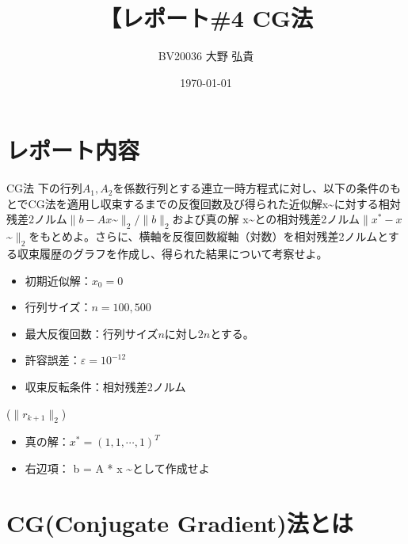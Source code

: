 \documentclass[titlepage, a4paper, 11pt, dvipdfmx]{jsarticle}
\title{\Huge【レポート\#4 CG法}
\date{\today}%
\author{\Large BV20036 \quad 大野 弘貴}%
\begin{document}
\maketitle
{}
\newpage
{}


\section{レポート内容}
\begin{itembox}[l]{CG法}
下の行列$A_1, A_2$を係数行列とする連立一時方程式に対し、以下の条件のもとでCG法を適用し収束するまでの反復回数及び得られた近似解x\textasciitilde に対する相対残差2ノルム$ \| b - Ax$\textasciitilde $ \|_2/ \| b \|_2 $および真の解 x\textasciitilde との相対残差2ノルム$ \| x^* - x$\textasciitilde $ \|_2 $をもとめよ。さらに、横軸を反復回数縦軸（対数）を相対残差2ノルムとする収束履歴のグラフを作成し、得られた結果について考察せよ。
    \begin{itemize}
        \item 初期近似解：$x_0 = 0 $
        \item 行列サイズ：$ n = 100, 500$
        \item 最大反復回数：行列サイズ$n$に対し$2n$とする。
        \item 許容誤差：$\varepsilon = 10^{-12}$
        \item 収束反転条件：相対残差2ノルム
    \end{itemize}
    ($\| r_{k+1} \|_2$)
    \begin{itemize}
        \item 真の解：$ x^* = ( 1,1,\cdots,1 )^T $
        \item 右辺項： b = A * x \textasciitilde として作成せよ
    \end{itemize}
\end{itembox}
    \section{CG(Conjugate Gradient)法とは}
\end{document}
